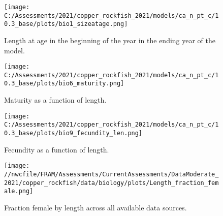 \documentclass[11pt,
  english,
  a4paper,
]{article}
\begin{document}
\begin{figure}
\centering
\texttt{[image: C:/Assessments/2021/copper\_rockfish\_2021/models/ca\_n\_pt\_c/10.3\_base/plots/bio1\_sizeatage.png]}
\caption{Length at age in the beginning of the year in the ending year of the model.\label{fig:len-age-ss}}
\end{figure}

\tagmcend\tagstructend

\clearpage


\begin{figure}
\centering
\texttt{[image: C:/Assessments/2021/copper\_rockfish\_2021/models/ca\_n\_pt\_c/10.3\_base/plots/bio6\_maturity.png]}
\caption{Maturity as a function of length.\label{fig:maturity}}
\end{figure}

\tagmcend\tagstructend

\clearpage


\begin{figure}
\centering
\texttt{[image: C:/Assessments/2021/copper\_rockfish\_2021/models/ca\_n\_pt\_c/10.3\_base/plots/bio9\_fecundity\_len.png]}
\caption{Fecundity as a function of length.\label{fig:fecundity}}
\end{figure}

\tagmcend\tagstructend

\clearpage


\begin{figure}
\centering
\texttt{[image: //nwcfile/FRAM/Assessments/CurrentAssessments/DataModerate\_2021/copper\_rockfish/data/biology/plots/Length\_fraction\_female.png]}
\caption{Fraction female by length across all available data sources.\label{fig:len-sex-ratio}}
\end{figure}

\tagmcend\tagstructend

\end{document}
